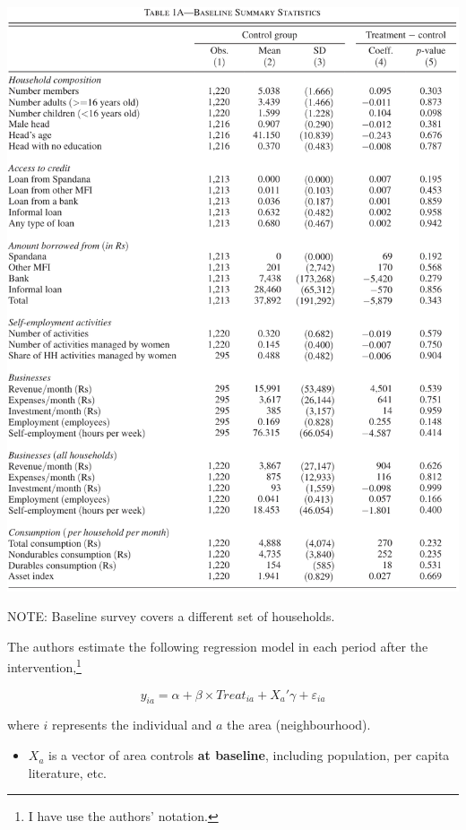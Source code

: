 \documentclass[
  letterpaper,
  DIV=11,
  numbers=noendperiod]{scrreprt}
\providecommand{\tightlist}{%
  \setlength{\itemsep}{0pt}\setlength{\parskip}{0pt}}\usepackage{longtable,booktabs,array}
\theoremstyle{definition}
\theoremstyle{remark}
\begin{document}
\includegraphics{Images/Banerjee_Baseline_1.png}

NOTE: Baseline survey covers a different set of households.

The authors estimate the following regression model in each period after
the intervention,\footnote{I have use the authors' notation.}

\[
            y_{ia} = \alpha + \beta \times Treat_{ia} + X_a'\gamma + \varepsilon_{ia}
\]

where \(i\) represents the individual and \(a\) the area
(neighbourhood).

\par

\begin{itemize}
\tightlist
\item
  \(X_a\) is a vector of area controls \textbf{at baseline}, including
  population, per capita literature, etc.
\end{itemize}
\end{document}
